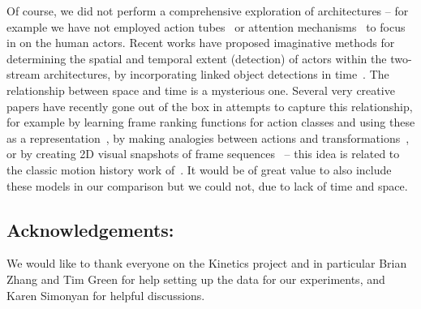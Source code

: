 \documentclass[10pt,twocolumn,letterpaper]{article}
\begin{document}
Of course, we did not perform a comprehensive exploration of architectures --
for example we have not employed action
tubes~\cite{gkioxari2015finding,Klaser10} or attention 
mechanisms~\cite{li2016videolstm} to focus in on the human actors. Recent works have proposed imaginative methods for determining the spatial and temporal extent (detection) of actors within the two-stream
architectures, by incorporating linked object detections in
time~\cite{peng2016multi,Saha_2016}.  The relationship between space and time is a mysterious one. Several
very creative papers have recently gone out of the box in attempts to
capture this relationship, for example by learning
frame ranking functions for action classes and using these as a
representation~\cite{fernando2015modeling}, by making analogies
between actions and transformations~\cite{wang2015actions}, or by
creating 2D visual snapshots of frame
sequences~\cite{bilen2016dynamic} -- this idea is related to the
classic motion history work of~\cite{bobick2001recognition}. It would
be of great value to also include these models in our comparison but
we could not, due to lack of time and space.

\subsection*{Acknowledgements:} We would like to thank everyone on the Kinetics project and in particular Brian Zhang and Tim Green for help setting up the data for our experiments, and Karen Simonyan for helpful discussions.

{\small


}

\newpage
\end{document}
